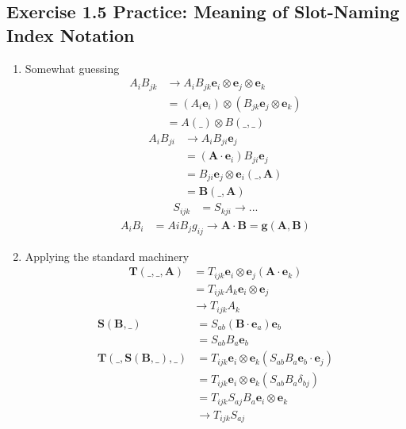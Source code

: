 \documentclass[../main.tex]{subfiles}
\begin{document}
\subsection{Exercise 1.5 Practice: Meaning of Slot-Naming Index Notation}
\begin{enumerate}[label=(\alph*)]
\item Somewhat guessing
\begin{align}
    A_iB_{jk}
    &\rightarrow A_iB_{jk}\mathbf{e}_i\otimes\mathbf{e}_j\otimes\mathbf{e}_k\\
    &= (A_i\mathbf{e}_i)\otimes (B_{jk}\mathbf{e}_j\otimes\mathbf{e}_k)\\
    &=A(\_)\otimes B(\_,\_)
\end{align}
\begin{align}
    A_iB_{ji}
    &\rightarrow A_iB_{ji}\mathbf{e}_j\\
    &=(\mathbf{A}\cdot\mathbf{e}_i)B_{ji}\mathbf{e}_j\\
    &=B_{ji}\mathbf{e}_j\otimes\mathbf{e}_i(\_,\mathbf{A})\\
    &=\mathbf{B}(\_,\mathbf{A})
\end{align}
\begin{align}
    S_{ijk}
    &=S_{kji}\rightarrow ...
\end{align}
\begin{align}
    A_iB_i&=AiB_jg_{ij}\rightarrow \mathbf{A}\cdot\mathbf{B}=\mathbf{g}(\mathbf{A},\mathbf{B})
\end{align}

\item Applying the standard machinery
\begin{align}
    \mathbf{T}(\_,\_,\mathbf{A})
    &=T_{ijk}\mathbf{e}_i\otimes\mathbf{e}_j(\mathbf{A}\cdot\mathbf{e}_k)\\
    &=T_{ijk}A_k\mathbf{e}_i\otimes\mathbf{e}_j\\
    &\rightarrow T_{ijk}A_k
\end{align}
\begin{align}
    \mathbf{S}(\mathbf{B},\_)
    &=S_{ab}(\mathbf{B}\cdot\mathbf{e}_a)\mathbf{e}_b\\
    &=S_{ab}B_a\mathbf{e}_b\\
    \mathbf{T}(\_,\mathbf{S}(\mathbf{B},\_),\_)
    &=T_{ijk}\mathbf{e}_i\otimes\mathbf{e}_k(S_{ab}B_a\mathbf{e}_b\cdot\mathbf{e}_j)\\
    &=T_{ijk}\mathbf{e}_i\otimes\mathbf{e}_k(S_{ab}B_a\delta_{bj})\\
    &=T_{ijk}S_{aj}B_a\mathbf{e}_i\otimes\mathbf{e}_k\\
    &\rightarrow T_{ijk}S_{aj}
\end{align}
\end{enumerate}
\end{document}
